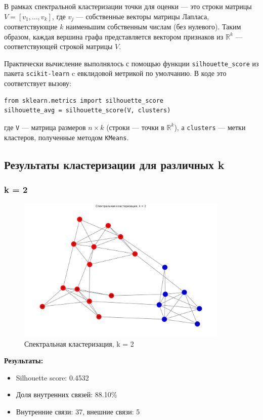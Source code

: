 В рамках спектральной кластеризации точки для оценки — это строки матрицы $V = [v_1,\ldots,v_k]$, где $v_j$ — собственные векторы матрицы Лапласа, соответствующие $k$ наименьшим собственным числам (без нулевого). Таким образом, каждая вершина графа представляется вектором признаков из $\mathbb{R}^k$ — соответствующей строкой матрицы $V$.

Практически вычисление выполнялось с помощью функции \texttt{silhouette\_score} из пакета \texttt{scikit-learn} c евклидовой метрикой по умолчанию. В коде это соответствует вызову:
\begin{lstlisting}
from sklearn.metrics import silhouette_score
silhouette_avg = silhouette_score(V, clusters)
\end{lstlisting}
где \texttt{V} — матрица размеров $n\times k$ (строки — точки в $\mathbb{R}^k$), а \texttt{clusters} — метки кластеров, полученные методом \texttt{KMeans}.

\subsection*{Результаты кластеризации для различных k}

\subsubsection*{k = 2}

\begin{figure}[H]
    \centering
    \includegraphics[width=0.9\textwidth]{images/task1/clustering_k2.png}
    \caption{Спектральная кластеризация, k = 2}
\end{figure}

\textbf{Результаты:}
\begin{itemize}
    \item Silhouette score: 0.4532
    \item Доля внутренних связей: 88.10\%
    \item Внутренние связи: 37, внешние связи: 5
\end{itemize}

